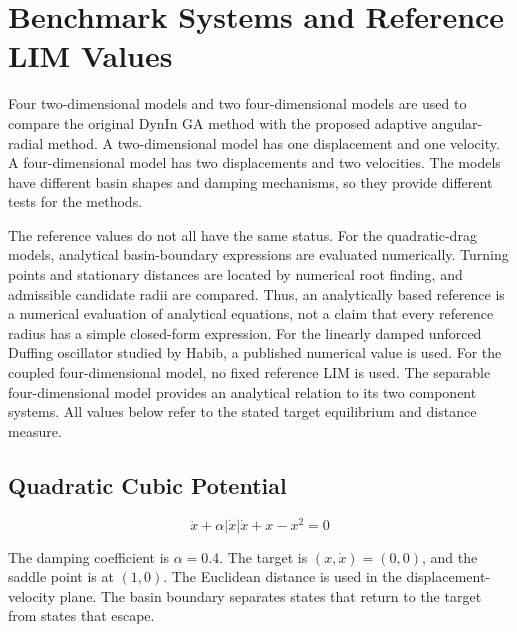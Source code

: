 \section{Benchmark Systems and Reference LIM Values}
\label{sec:benchmarks}

\begin{revision}
Four two-dimensional models and two four-dimensional models are used to compare the original DynIn GA method with the proposed adaptive angular-radial method. A two-dimensional model has one displacement and one velocity. A four-dimensional model has two displacements and two velocities. The models have different basin shapes and damping mechanisms, so they provide different tests for the methods.
\end{revision}

\begin{bluerevision}
The reference values do not all have the same status. For the quadratic-drag models, analytical basin-boundary expressions are evaluated numerically. Turning points and stationary distances are located by numerical root finding, and admissible candidate radii are compared. Thus, an analytically based reference is a numerical evaluation of analytical equations, not a claim that every reference radius has a simple closed-form expression. For the linearly damped unforced Duffing oscillator studied by Habib, a published numerical value is used. For the coupled four-dimensional model, no fixed reference LIM is used. The separable four-dimensional model provides an analytical relation to its two component systems. All values below refer to the stated target equilibrium and distance measure.
\end{bluerevision}

\subsection{Quadratic Cubic Potential}

\begin{equation}
  \ddot{x} + \alpha |\dot{x}|\dot{x} + x - {x}^{2} = 0
\end{equation}

\begin{revision}
The damping coefficient is $\alpha =0.4$. The target is $(x,\dot{x})=(0,0)$, and the saddle point is at $(1,0)$. The Euclidean distance is used in the displacement-velocity plane. The basin boundary separates states that return to the target from states that escape.
\end{revision}

